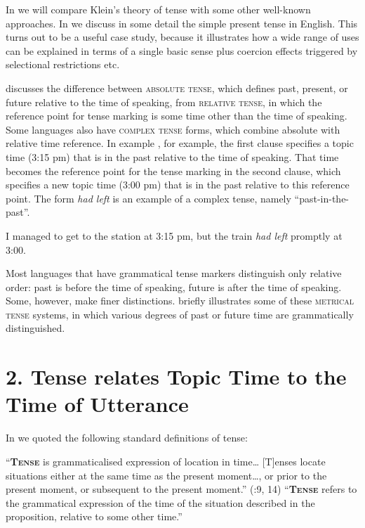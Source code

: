 In  we will compare Klein’s theory of tense with some other well-known approaches. In  we discuss in some detail the simple present tense in English. This turns out to be a useful case study, because it illustrates how a wide range of uses can be explained in terms of a single basic sense plus coercion effects triggered by selectional restrictions etc.



 discusses the difference between \textsc{absolute tense}, which defines past, present, or future relative to the time of speaking, from \textsc{relative tense}, in which the reference point for tense marking is some time other than the time of speaking. Some languages also have \textsc{complex tense} forms, which combine absolute with relative time reference. In example , for example, the first clause specifies a topic time (3:15 pm) that is in the past relative to the time of speaking. That time becomes the reference point for the tense marking in the second clause, which specifies a new topic time (3:00 pm) that is in the past relative to this reference point. The form \textit{had left} is an example of a complex tense, namely “past-in-the-past”.


\ea
I managed to get to the station at 3:15 pm, but the train \textit{had left} promptly at 3:00.
\z


Most languages that have grammatical tense markers distinguish only relative order: past is before the time of speaking, future is after the time of speaking. Some, however, make finer distinctions.  briefly illustrates some of these \textsc{metrical tense} systems, in which various degrees of past or future time are grammatically distinguished. 


\section{2. Tense relates Topic Time to the Time of Utterance}\label{sec:}

In  we quoted the following standard definitions of tense:


\ea
\ea  “\textbf{\textsc{Tense}} is grammaticalised expression of location in time… [T]enses locate situations either at the same time as the present moment…, or prior to the present moment, or subsequent to the present moment.” (\citealt{Comrie1985}:9, 14)
\ex   “\textbf{\textsc{Tense}} refers to the grammatical expression of the time of the situation described in the proposition, relative to some other time.” \citep{Bybee1985}
\z \z


